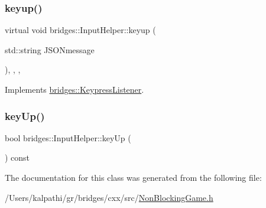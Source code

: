 \subsubsection{\texorpdfstring{keyup()}{keyup()}}
{\footnotesize\ttfamily virtual void bridges\+::\+Input\+Helper\+::keyup (\begin{DoxyParamCaption}\item[{std\+::string}]{J\+S\+O\+Nmessage }\end{DoxyParamCaption})\hspace{0.3cm}{\ttfamily [inline]}, {\ttfamily [override]}, {\ttfamily [protected]}, {\ttfamily [virtual]}}



Implements \mbox{\hyperlink{classbridges_1_1_keypress_listener_ad5af91d35dc485182056ca821f3ce03e}{bridges\+::\+Keypress\+Listener}}.

\mbox{\label{classbridges_1_1_input_helper_a4af008528d2dcb4b985050c2945875fc}} 
\subsubsection{\texorpdfstring{keyUp()}{keyUp()}}
{\footnotesize\ttfamily bool bridges\+::\+Input\+Helper\+::key\+Up (\begin{DoxyParamCaption}{ }\end{DoxyParamCaption}) const\hspace{0.3cm}{\ttfamily [inline]}}



The documentation for this class was generated from the following file\+:\begin{DoxyCompactItemize}
\item 
/\+Users/kalpathi/gr/bridges/cxx/src/\mbox{\hyperlink{_non_blocking_game_8h}{Non\+Blocking\+Game.\+h}}\end{DoxyCompactItemize}
